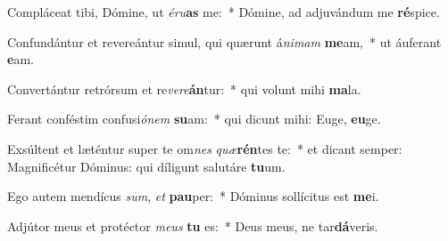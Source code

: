 \item Compláceat tibi, Dómine, ut \textit{é}\textit{ru}\textbf{as} me:~* Dómine, ad adjuvándum me \textbf{ré}spice.
\item Confundántur et revereántur simul, qui quærunt á\textit{ni}\textit{mam} \textbf{me}am,~* ut áuferant \textbf{e}am.
\item Convertántur retrórsum et re\textit{ve}\textit{re}\textbf{án}tur:~* qui volunt mihi \textbf{ma}la.
\item Ferant conféstim confusi\textit{ó}\textit{nem} \textbf{su}am:~* qui dicunt mihi: Euge, \textbf{eu}ge.
\item Exsúltent et læténtur super te om\textit{nes} \textit{quæ}\textbf{rén}tes te:~* et dicant semper: Magnificétur Dóminus: qui díligunt salutáre \textbf{tu}um.
\item Ego autem mendícus \textit{sum}, \textit{et} \textbf{pau}per:~* Dóminus sollícitus est \textbf{me}i.
\item Adjútor meus et protéctor \textit{me}\textit{us} \textbf{tu} es:~* Deus meus, ne tar\textbf{dá}veris.
